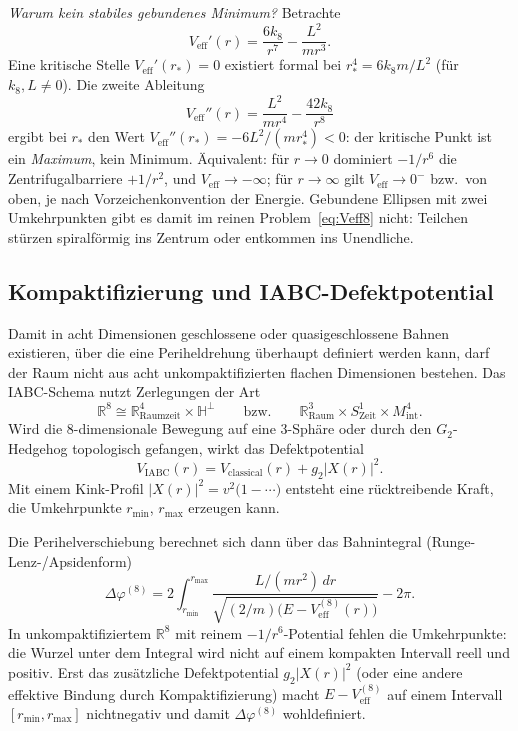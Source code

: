\documentclass[11pt,a4paper]{article}
\theoremstyle{definition}
\theoremstyle{remark}
\newcommand{\R}{\mathbb{R}}
\newcommand{\HH}{\mathbb{H}}
\begin{document}
\emph{Warum kein stabiles gebundenes Minimum?} Betrachte
\begin{equation}
  V_{\mathrm{eff}}'(r)=\frac{6k_8}{r^7}-\frac{L^2}{m r^3}.
\end{equation}
Eine kritische Stelle \(V_{\mathrm{eff}}'(r_*)=0\) existiert formal bei
\(r_*^4=6k_8 m/L^2\) (für \(k_8,L\neq 0\)). Die zweite Ableitung
\begin{equation}
  V_{\mathrm{eff}}''(r)=\frac{L^2}{m r^4}-\frac{42 k_8}{r^8}
\end{equation}
ergibt bei \(r_*\) den Wert \(V_{\mathrm{eff}}''(r_*)=-6L^2/(m r_*^4)<0\): der kritische Punkt
ist ein \emph{Maximum}, kein Minimum. Äquivalent: für \(r\to 0\) dominiert \(-1/r^6\) die
Zentrifugalbarriere \(+1/r^2\), und \(V_{\mathrm{eff}}\to-\infty\); für \(r\to\infty\) gilt
\(V_{\mathrm{eff}}\to 0^-\) bzw.\ von oben, je nach Vorzeichenkonvention der Energie.
Gebundene Ellipsen mit zwei Umkehrpunkten gibt es damit im reinen Problem~\eqref{eq:Veff8}
nicht: Teilchen stürzen spiralförmig ins Zentrum oder entkommen ins Unendliche.

\subsection{Kompaktifizierung und IABC-Defektpotential}

Damit in acht Dimensionen geschlossene oder quasigeschlossene Bahnen existieren, über die
eine Periheldrehung überhaupt definiert werden kann, darf der Raum nicht aus acht
unkompaktifizierten flachen Dimensionen bestehen. Das IABC-Schema nutzt Zerlegungen der Art
\begin{equation}
  \R^8\cong\R^4_{\mathrm{Raumzeit}}\times\HH^\perp
  \qquad\text{bzw.}\qquad
  \R^3_{\mathrm{Raum}}\times S^1_{\mathrm{Zeit}}\times M_{\mathrm{int}}^4.
\end{equation}
Wird die 8-dimensionale Bewegung auf eine 3-Sphäre oder durch den \(G_2\)-Hedgehog
topologisch gefangen, wirkt das Defektpotential
\begin{equation}
  V_{\mathrm{IABC}}(r)=V_{\mathrm{classical}}(r)+g_2|X(r)|^2.
\end{equation}
Mit einem Kink-Profil \(|X(r)|^2=v^2\bigl(1-\cdots\bigr)\) entsteht eine rücktreibende Kraft,
die Umkehrpunkte \(r_{\min}\), \(r_{\max}\) erzeugen kann.

Die Perihelverschiebung berechnet sich dann über das Bahnintegral (Runge-Lenz-/Apsidenform)
\begin{equation}
  \Delta\varphi^{(8)}
  =2\int_{r_{\min}}^{r_{\max}}
  \frac{L/(m r^2)\,dr}{\sqrt{(2/m)\bigl(E-V_{\mathrm{eff}}^{(8)}(r)\bigr)}}
  -2\pi.
  \label{eq:Dphi8}
\end{equation}
In unkompaktifiziertem \(\R^8\) mit reinem \(-1/r^6\)-Potential fehlen die Umkehrpunkte:
die Wurzel unter dem Integral wird nicht auf einem kompakten Intervall reell und
positiv. Erst das zusätzliche Defektpotential \(g_2|X(r)|^2\) (oder eine andere
effektive Bindung durch Kompaktifizierung) macht \(E-V_{\mathrm{eff}}^{(8)}\) auf einem
Intervall \([r_{\min},r_{\max}]\) nichtnegativ und damit \(\Delta\varphi^{(8)}\)
wohldefiniert.
\end{document}

